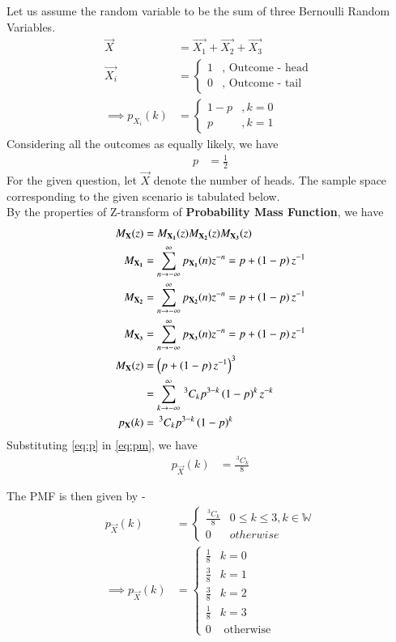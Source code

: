 \documentclass[journal]{IEEEtran}
\newcommand{\nCr}[2]{\,^{#1}C_{#2}}
\begin{document}

Let us assume the random variable to be the sum of three Bernoulli Random Variables.
\begin{align}
	\vec{X} &= \vec{X_{1}} + \vec{X_{2}} + \vec{X_{3}} \\
	\vec{X_{i}} &= 
	\begin{cases}
		1 & , \text{ Outcome - head } \\
		0 & , \text{ Outcome - tail }
	\end{cases} \\
	\implies p_{X_{i}} (k) &= 
	\begin{cases}
		1 - p & , k = 0 \\
		p & , k = 1
	\end{cases}
\end{align}
Considering all the outcomes as equally likely, we have
\begin{align}
	p &= \frac{1}{2} \label{eq:p}
\end{align}
For the given question, let $\vec{X}$ denote the number of heads. The sample space corresponding to the given scenario is tabulated below. \\

By the properties of Z-transform of \textbf{Probability Mass Function}, we have
\begin{align}
	M_{\vec{X}} (z) &= M_{\vec{X_{1}}} (z) M_{\vec{X_{2}}} (z) M_{\vec{X_{3}}} (z) \\
	M_{\vec{X_{1}}} &= \sum_{n \to - \infty}^{\infty} p_{\vec{X_{1}}} (n) z^{-n} = p + \brak{1-p}z^{-1} \\
	M_{\vec{X_{2}}} &= \sum_{n \to - \infty}^{\infty} p_{\vec{X_{2}}} (n) z^{-n} = p + \brak{1-p}z^{-1} \\
	M_{\vec{X_{3}}} &= \sum_{n \to - \infty}^{\infty} p_{\vec{X_{3}}} (n) z^{-n} = p + \brak{1-p}z^{-1} \\
	M_{\vec{X}} (z) &= \brak{p + \brak{1 - p}z^{-1}}^3 \\
	                &= \sum_{k \to -\infty}^{\infty} \nCr{3}{k} p^{3-k} \brak{1-p}^{k} z^{-k} \\
	p_{\vec{X}} (k) &= \nCr{3}{k} p^{3-k} \brak{1-p}^{k} \label{eq:pm}
\end{align}
Substituting \eqref{eq:p} in \eqref{eq:pm}, we have
\begin{align}
	p_{\vec{X}} (k) &= \frac{\nCr{3}{k}}{8} \label{eq:pmf}
\end{align}

The PMF is then given by - 
\begin{align}
p_{\vec{X}} (k) &= 
\begin{cases}
	\frac{\nCr{3}{k}}{8} & 0 \leq k \leq 3, k \in \mathbb{W} \\
	0 & otherwise
\end{cases} \\
\implies p_{\vec{X}} (k) &= 
\begin{cases}
	\frac{1}{8} & k = 0 \\
	\frac{3}{8} & k = 1 \\
	\frac{3}{8} & k = 2 \\
	\frac{1}{8} & k = 3 \\
	0 & \text{ otherwise }
\end{cases}
\end{align}
\end{document}
